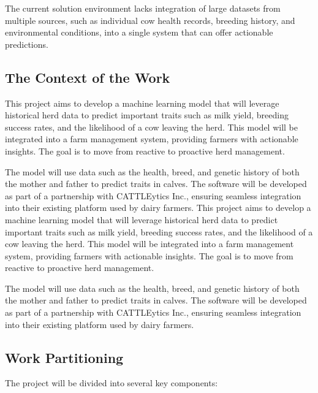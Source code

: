 \documentclass[12pt]{article}
\begin{document}
The current solution environment lacks integration of large datasets from multiple 
sources, such as individual cow health records, breeding history, and environmental 
conditions, into a single system that can offer actionable predictions.
\subsection{The Context of the Work}
This project aims to develop a machine learning model that will leverage 
historical herd data to predict important traits such as milk yield, breeding 
success rates, and the likelihood of a cow leaving the herd. This model will be 
integrated into a farm management system, providing farmers with actionable 
insights. The goal is to move from reactive to proactive herd management.

The model will use data such as the health, breed, and genetic history of both 
the mother and father to predict traits in calves. The software will be 
developed as part of a partnership with CATTLEytics Inc., ensuring seamless 
integration into their existing platform used by dairy farmers.
This project aims to develop a machine learning model that will leverage 
historical herd data to predict important traits such as milk yield, breeding 
success rates, and the likelihood of a cow leaving the herd. This model will be 
integrated into a farm management system, providing farmers with actionable 
insights. The goal is to move from reactive to proactive herd management.

The model will use data such as the health, breed, and genetic history of both 
the mother and father to predict traits in calves. The software will be 
developed as part of a partnership with CATTLEytics Inc., ensuring seamless 
integration into their existing platform used by dairy farmers.
\subsection{Work Partitioning}
The project will be divided into several key components:
\end{document}
